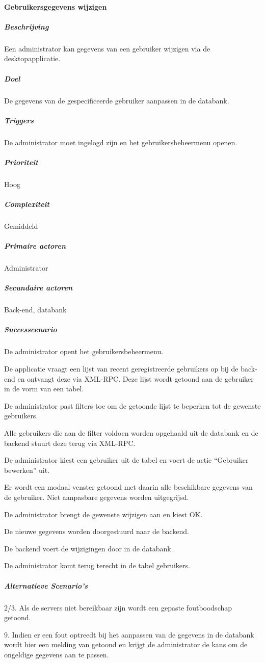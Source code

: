 \paragraph{Gebruikersgegevens wijzigen}
\begin{compact}
\subparagraph{Beschrijving} Een administrator kan gegevens van een gebruiker wijzigen via de desktopapplicatie.
\subparagraph{Doel} De gegevens van de gespecificeerde gebruiker aanpassen in de databank.
\subparagraph{Triggers}De administrator moet ingelogd zijn en het gebruikersbeheermenu openen.
\subparagraph{Prioriteit}Hoog
\subparagraph{Complexiteit}Gemiddeld
\subparagraph{Primaire actoren}Administrator
\subparagraph{Secundaire actoren}Back-end, databank
\subparagraph{Successcenario}
\begin{enumerate_compact}
 \item De administrator opent het gebruikersbeheermenu.
 \item De applicatie vraagt een lijst van recent geregistreerde gebruikers op bij de back-end en ontvangt deze via XML-RPC. Deze lijst wordt getoond aan de gebruiker in de vorm van een tabel.
 \item De administrator past filters toe om de getoonde lijst te beperken tot de gewenste gebruikers.
 \item Alle gebruikers die aan de filter voldoen worden opgehaald uit de databank en de backend stuurt deze terug via XML-RPC.
 \item De administrator kiest een gebruiker uit de tabel en voert de actie ``Gebruiker bewerken'' uit.
 \item Er wordt een modaal venster getoond met daarin alle beschikbare gegevens van de gebruiker. Niet aanpasbare gegevens worden uitgegrijsd.
 \item De administrator brengt de gewenste wijzigen aan en kiest OK.
 \item De nieuwe gegevens worden doorgestuurd naar de backend.
 \item De backend voert de wijzigingen door in de databank.
 \item De administrator komt terug terecht in de tabel gebruikers.
\end{enumerate_compact}
\subparagraph{Alternatieve Scenario's}
\begin{enumerate_compact}
	\item[2/3.] Als de servers niet bereikbaar zijn wordt een gepaste foutboodschap getoond.
	\item[9.] Indien er een fout optreedt bij het aanpassen van de gegevens in de databank wordt hier een melding van getoond en krijgt de administrator de kans om de ongeldige gegevens aan te passen.
\end{enumerate_compact}
\end{compact}

